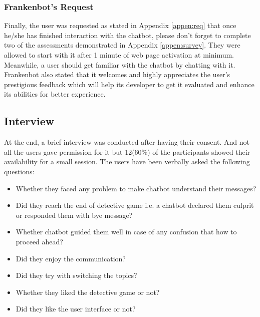 \subsubsection*{Frankenbot's Request}
Finally, the user was requested as stated in Appendix \ref{appen:req} that once he/she has finished interaction with the chatbot, please don't forget to complete two of the assessments demonstrated in Appendix \ref{appen:survey}. They were allowed to start with it after 1 minute of web page activation at minimum. Meanwhile, a user should get familiar with the chatbot by chatting with it. Frankenbot also stated that it welcomes and highly appreciates the user's prestigious feedback which will help its developer to get it evaluated and enhance its abilities for better experience.

\subsection{Interview\label{subsec:interview}}
At the end, a brief interview was conducted after having their consent. And not all the users gave permission for it but 12(60\%) of the participants showed their availability for a small session. The users have been verbally asked the following questions:
\begin{itemize}
    \item Whether they faced any problem to make chatbot understand their messages?
    \item Did they reach the end of detective game i.e. a chatbot declared them culprit or responded them with bye message?
    \item Whether chatbot guided them well in case of any confusion that how to proceed ahead?
    \item Did they enjoy the communication?
    \item Did they try with switching the topics?
    \item Whether they liked the detective game or not?
    \item Did they like the user interface or not?
\end{itemize}

